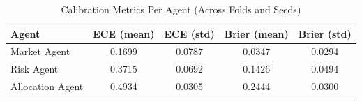 \begin{table}[t]
\centering
\caption{Calibration Metrics Per Agent (Across Folds and Seeds)}
\label{tab:calibration}
\begin{tabular}{lcccc}
\toprule
Agent & ECE (mean) & ECE (std) & Brier (mean) & Brier (std) \\
\midrule
  Market Agent & 0.1699 & 0.0787 & 0.0347 & 0.0294 \\
  Risk Agent & 0.3715 & 0.0692 & 0.1426 & 0.0494 \\
  Allocation Agent & 0.4934 & 0.0305 & 0.2444 & 0.0300 \\
\bottomrule
\end{tabular}
\end{table}